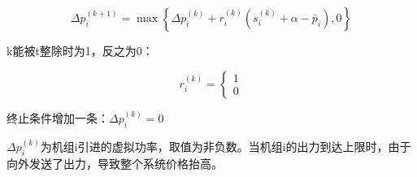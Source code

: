 \begin{equation}
    \Delta p_{i}^{(k+1)}=\max \left\{\Delta p_{i}^{(k)}+r_{i}^{(k)}\left(s_{i}^{(k)}+\alpha-\bar{p}_{i}\right), 0\right\}
\end{equation}

k能被t整除时为1，反之为0：

\begin{equation}
    r_{i}^{(k)}=\left\{\begin{array}{l}
    {1} \\
    {0}
    \end{array}\right.
\end{equation}


终止条件增加一条：$\Delta p_{i}^{(k)}=0$

$\Delta p_{i}^{(k)}$为机组i引进的虚拟功率，取值为非负数。当机组i的出力到达上限时，由于向外发送了出力，导致整个系统价格抬高。
